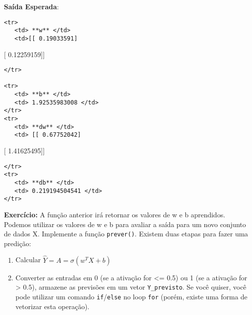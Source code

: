 \documentclass[11pt]{article}
\begin{document}
    \textbf{Saída Esperada}:

\begin{verbatim}
<tr>
   <td> **w** </td>
   <td>[[ 0.19033591]
\end{verbatim}

{[} 0.12259159{]}{]}

\begin{verbatim}
</tr>

<tr>
   <td> **b** </td>
   <td> 1.92535983008 </td>
</tr>
<tr>
   <td> **dw** </td>
   <td> [[ 0.67752042]
\end{verbatim}

{[} 1.41625495{]}{]}

\begin{verbatim}
</tr>
<tr>
   <td> **db** </td>
   <td> 0.219194504541 </td>
</tr>
\end{verbatim}

    \textbf{Exercício:} A função anterior irá retornar os valores de w e b
aprendidos. Podemos utilizar os valores de w e b para avaliar a saída
para um novo conjunto de dados X. Implemente a função \texttt{prever()}.
Existem duas etapas para fazer uma predição:

\begin{enumerate}
\def\labelenumi{\arabic{enumi}.}
\item
  Calcular \(\hat{Y} = A = \sigma(w^T X + b)\)
\item
  Converter as entradas em 0 (se a ativação for \textless{}= 0.5) ou 1
  (se a ativação for \textgreater{} 0.5), armazene as previsões em um
  vetor \texttt{Y\_previsto}. Se você quiser, você pode utilizar um
  comando \texttt{if}/\texttt{else} no loop \texttt{for} (porém, existe
  uma forma de vetorizar esta operação).
\end{enumerate}
\end{document}
